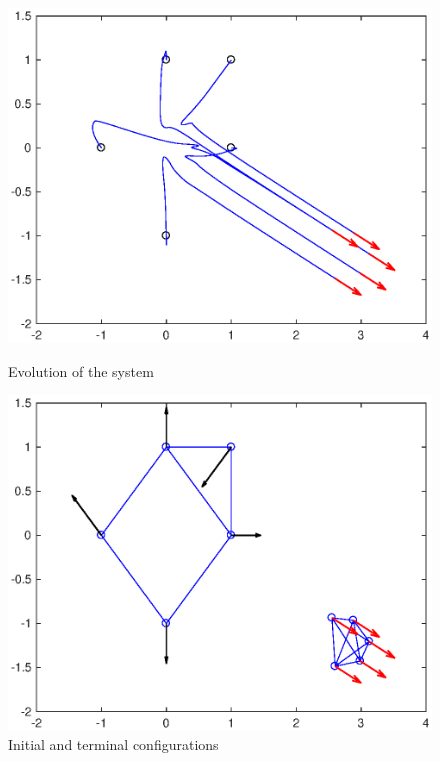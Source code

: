 \documentclass[a4paper,10pt, english]{article}
\begin{document}
\begin{figure}[ht]
  \begin{minipage}[b]{0.5\textwidth}
    \includegraphics[width=\textwidth]{figures/a5D_L+V_fine_mesh_NICE_ev.eps}
    \caption{Evolution of the system}
    \label{ev}
  \end{minipage}
  \hfill
  \begin{minipage}[b]{0.5\textwidth}
    \includegraphics[width=\textwidth]{figures/a5D_L+V_fine_mesh_NICE_g.eps}
    \caption{Initial and terminal configurations}
    \label{g}
  \end{minipage}
\end{figure}
\end{document}

